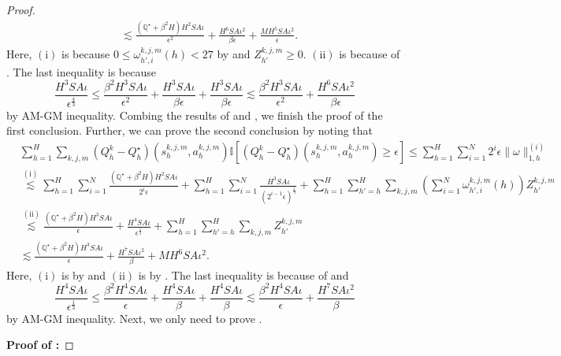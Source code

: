 \documentclass{article}
\begin{document}
\begin{proof}
\begin{align}
        &\lesssim \frac{\left(\mathbb{Q}^\star+\beta^2H\right)H^2SA\iota}{\epsilon^2} + \frac{H^6SA\iota^2}{\beta\epsilon}+ \frac{MH^5SA\iota^2}{\epsilon}.
    \end{align}
    Here, $\mathrm{(i)}$ is because $0 \leq \omega_{h',i}^{k,j,m}(h) < 27$ by  and $Z_{h'}^{k,j,m} \geq 0$. $\mathrm{(ii)}$ is because of . The last inequality is because
    $$\frac{H^3SA\iota}{\epsilon^{\frac{4}{3}}} \leq \frac{\beta^2H^3SA\iota }{\epsilon^2} + \frac{H^3SA\iota}{\beta\epsilon}+\frac{H^3SA\iota}{\beta\epsilon} \lesssim \frac{\beta^2H^3SA\iota }{\epsilon^2}+\frac{H^6SA\iota^2}{\beta\epsilon}$$
    by AM-GM inequality.
    Combing the results of  and , we finish the proof of the first conclusion. Further, we can prove the second conclusion by noting that
   \begin{align*} 
  &\sum_{h=1}^H \sum_{k,j,m} \left(Q_h^k - Q_h^{\star}\right)(s_h^{k,j,m}, a_h^{k,j,m}) \mathbb{I}\left[ \left(Q_h^k - Q_h^{\star}\right)(s_h^{k,j,m}, a_h^{k,j,m}) \geq \epsilon \right]\leq \sum_{h=1}^H\sum_{i = 1}^N 2^i\epsilon\|\omega\|_{1,h}^{(i)} \nonumber\\
    &\overset{\mathrm{(i)}}{\lesssim} \sum_{h=1}^H\sum_{i = 1}^N  \frac{\left(\mathbb{Q}^\star+\beta^2H\right)H^2SA\iota}{2^i\epsilon}+\sum_{h=1}^H\sum_{i=1}^N\frac{H^3SA\iota}{(2^{i-1}\epsilon)^{\frac{1}{3}}} + \sum_{h=1}^H\sum_{h' = h}^{H}\sum_{k,j,m} \left(\sum_{i = 1}^N\omega_{h',i}^{k,j,m}(h)\right)Z_{h'}^{k,j,m} \\
    &\overset{\mathrm{(ii)}}{\lesssim} \frac{\left(\mathbb{Q}^\star+\beta^2H\right)H^3SA \iota}{\epsilon}+\frac{H^4SA\iota}{\epsilon^{\frac{1}{3}}} +  \sum_{h=1}^H\sum_{h' = h}^{H}\sum_{k,j,m}Z_{h'}^{k,j,m} \\
    &\lesssim \frac{\left(\mathbb{Q}^\star+\beta^2H\right)H^3SA \iota}{\epsilon}  + \frac{H^7SA\iota^2}{\beta}+ MH^6SA\iota^2.
\end{align*}
Here, $\mathrm{(i)}$ is by  and $\mathrm{(ii)}$ is by . The last inequality is because of  and 
$$\frac{H^4SA\iota}{\epsilon^{\frac{1}{3}}} \leq \frac{\beta^2H^4SA\iota }{\epsilon} + \frac{H^4SA\iota}{\beta}+\frac{H^4SA\iota}{\beta} \lesssim \frac{\beta^2H^4SA\iota }{\epsilon}+\frac{H^7SA\iota^2}{\beta}$$
    by AM-GM inequality. Next, we only need to prove .

\textbf{Proof of :} 


\end{proof}
\end{document}
